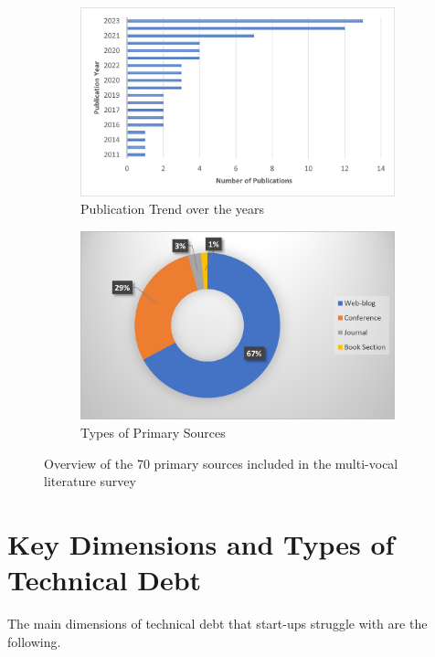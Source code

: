 \begin{figure}
  \begin{subfigure}[b]{0.45\linewidth}
	\centering
	\includegraphics[width=\linewidth]{PublicationTrend.jpg}
	\caption{Publication Trend over the years}
	\label{fig:Trend}
  \end{subfigure}
\hfill
  \begin{subfigure}[b]{0.45\linewidth}
	\centering
	\includegraphics[width=\linewidth]{TypeSources.jpg}
	\caption{Types of Primary Sources}
	\label{fig:Sources}
  \end{subfigure}
  \label{fig:Overview}
  \caption{Overview of the 70 primary sources included in the multi-vocal literature survey}
\end{figure}

\section{Key Dimensions and Types of Technical Debt}
\label{sec:dimensions}
The main dimensions of technical debt that start-ups struggle with are the following.

